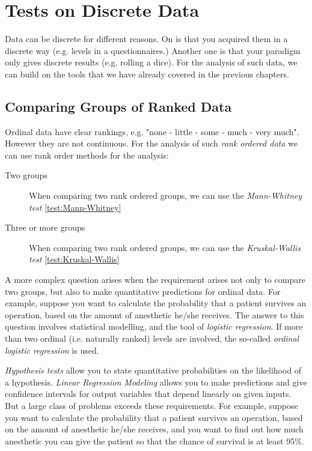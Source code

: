 \chapter{Tests on Discrete Data}

Data can be discrete for different reasons. On is that you acquired them in a discrete way (e.g. levels in a questionnaires.) Another one is that your paradigm only gives discrete results (e.g. rolling a dice). For the analysis of such data, we can build on the tools that we have already covered in the previous chapters.

\section{Comparing Groups of Ranked Data}

Ordinal data have clear rankings, e.g. "none - little - some - much - very much". However they are not continuous. For the analysis of such \emph{rank ordered data} we can use rank order methods for the analysis:

\begin{description}
  \item[Two groups] When comparing two rank ordered groups, we can use the \emph{Mann-Whitney test} \ref{test:Mann-Whitney}
  \item[Three or more groups]  When comparing two rank ordered groups, we can use the \emph{Kruskal-Wallis test} \ref{test:Kruskal-Wallis}

\end{description}

A more complex question arises when the requirement arises not only to compare two groups, but also to make quantitative predictions for ordinal data. For example, suppose you want to calculate the probability that a patient survives an operation, based on the amount of anesthetic he/she receives. The answer to this question involves statistical modelling, and the tool of \emph{logistic regression}. If more than two ordinal (i.e. naturally ranked) levels are involved, the so-called \emph{ordinal logistic regression} is used.

\emph{Hypothesis tests} allow you to state quantitative probabilities on the likelihood of a hypothesis. \emph{Linear Regression Modeling} allows you to make predictions and give confidence intervals for output variables that depend linearly on given inputs. But a large class of problems exceeds these requirements. For example, suppose you want to calculate the probability that a patient survives an operation, based on the amount of anesthetic he/she receives, and you want to find out how much anesthetic you can give the patient so that the chance of survival is at least 95\%.

